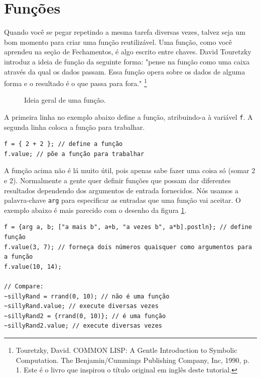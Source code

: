 \section{Funções}
\label{sec:functions}

Quando você se pegar repetindo a mesma tarefa diversas vezes, talvez seja um bom momento para criar uma função reutilizável. Uma função, como você aprendeu na seção de Fechamentos, é algo escrito entre chaves. David Touretzky introduz a ideia de função da seguinte forma: "pense na função como uma caixa através da qual os dados passam. Essa função opera sobre os dados de alguma forma e o resultado é o que passa para fora." \footnote{Touretzky, David. COMMON LISP: A Gentle Introduction to Symbolic Computation. The Benjamin/Cummings Publishing Company, Inc, 1990, p. 1. Este é o livro que inspirou o título original em inglês deste tutorial.}

\begin{figure}[h]
\centerline{}
\caption{Ideia geral de uma função.}
\label{fig:function-box}
\end{figure}

A primeira linha no exemplo abaixo define a função, atribuindo-a à variável \texttt{f}. A segunda linha coloca a função para trabalhar.

 
\begin{lstlisting}[style=SuperCollider-IDE, basicstyle=\scttfamily\footnotesize]
f = { 2 + 2 }; // define a função
f.value; // põe a função para trabalhar
\end{lstlisting}
 
A função acima não é lá muito útil, pois apenas sabe fazer uma coisa só (somar 2 e 2). Normalmente a gente quer definir funções que possam dar diferentes resultados dependendo dos argumentos de entrada fornecidos. Nós usamos a palavra-chave \texttt{arg} para especificar as entradas que uma função vai aceitar. O exemplo abaixo é mais parecido com o desenho da figura \ref{fig:function-box}.
 
\begin{lstlisting}[style=SuperCollider-IDE, basicstyle=\scttfamily\footnotesize]
f = {arg a, b; ["a mais b", a+b, "a vezes b", a*b].postln}; // define função
f.value(3, 7); // forneça dois números quaisquer como argumentos para a função
f.value(10, 14);

// Compare:
~sillyRand = rrand(0, 10); // não é uma função
~sillyRand.value; // execute diversas vezes
~sillyRand2 = {rrand(0, 10)}; // é uma função
~sillyRand2.value; // execute diversas vezes
\end{lstlisting}
 
